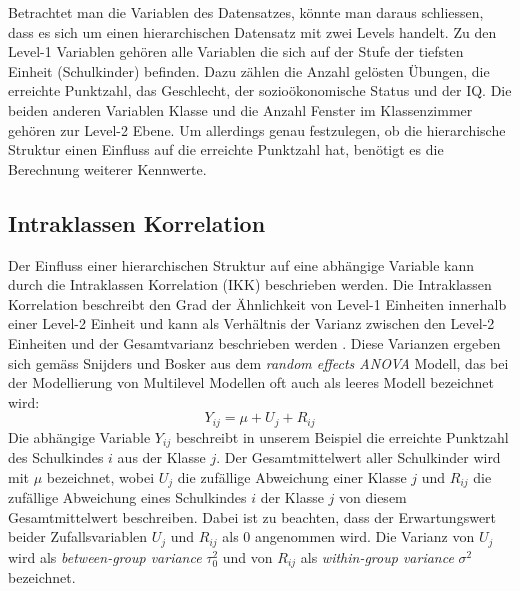 \documentclass[12pt]{article}\usepackage[]{graphicx}\usepackage[]{color}
\begin{document}
Betrachtet man die Variablen des Datensatzes, könnte man daraus schliessen, dass es sich um einen hierarchischen Datensatz mit zwei Levels handelt. Zu den Level-1 Variablen gehören alle Variablen die sich auf der Stufe der tiefsten Einheit (Schulkinder) befinden. Dazu zählen die Anzahl gelösten Übungen, die erreichte Punktzahl, das Geschlecht, der sozioökonomische Status und der IQ. Die beiden anderen Variablen Klasse und die Anzahl Fenster im Klassenzimmer gehören zur Level-2 Ebene. Um allerdings genau festzulegen, ob die hierarchische Struktur einen Einfluss auf die erreichte Punktzahl hat, benötigt es die Berechnung weiterer Kennwerte. 

\subsection{Intraklassen Korrelation} \label{section:icc}
Der Einfluss einer hierarchischen Struktur auf eine abhängige Variable kann durch die Intraklassen Korrelation (IKK) beschrieben werden. Die Intraklassen Korrelation beschreibt den Grad der Ähnlichkeit von Level-1 Einheiten innerhalb einer Level-2 Einheit und kann als Verhältnis der Varianz zwischen den Level-2 Einheiten und der Gesamtvarianz beschrieben werden \citep{FieldAndy2013DsuR, SnijdersTomA.B2012Ma:a, twisk_2006}. Diese Varianzen ergeben sich gemäss Snijders und Bosker \citeyearpar{SnijdersTomA.B2012Ma:a} aus dem \textit{random effects ANOVA} Modell, das bei der Modellierung von Multilevel Modellen oft auch als leeres Modell bezeichnet wird:
\begin{equation} \label{eq:empty_model}
Y_{ij} = \mu + U_{j} + R_{ij}
\end{equation}
Die abhängige Variable $Y_{ij}$ beschreibt in unserem Beispiel die erreichte Punktzahl des Schulkindes $i$ aus der Klasse $j$. Der Gesamtmittelwert aller Schulkinder wird mit $\mu$ bezeichnet, wobei $U_{j}$ die zufällige Abweichung einer Klasse $j$ und $R_{ij}$ die zufällige Abweichung eines Schulkindes $i$ der Klasse $j$ von diesem Gesamtmittelwert beschreiben. Dabei ist zu beachten, dass der Erwartungswert beider Zufallsvariablen $U_{j}$ und $R_{ij}$ als 0 angenommen wird. Die Varianz von $U_{j}$ wird als \textit{between-group variance} $\tau_{0}^2$ und von $R_{ij}$ als \textit{within-group variance} $\sigma^2$ bezeichnet.
\end{document}

